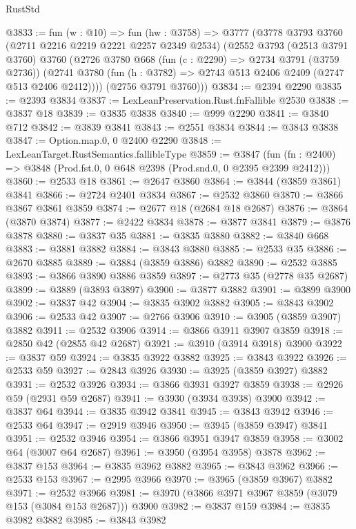 \begin{lexlean}{RustStd}
\begin{coremodule}
@3833 := fun (w : @10) =>
  fun (hw : @3758) =>
  @3777
    (@3778
      @3793
      @3760
      (@2711 @2216 @2219 @2221 @2257 @2349 @2534)
      (@2552
        @3793
        (@2513 @3791 @3760)
        @3760
        (@2726
          @3780
          @668
          (fun (c : @2290) => @2734 @3791 (@3759 @2736))
          (@2741 @3780 (fun (h : @3782) => @2743 @513 @2406 @2409 (@2747 @513 @2406 @2412))))
        (@2756 @3791 @3760)))
@3834 := @2394 @2290
@3835 := @2393 @3834
@3837 := LexLeanPreservation.Rust.fnFallible @2530
@3838 := @3837 @18
@3839 := @3835 @3838
@3840 := @999 @2290
@3841 := @3840 @712
@3842 := @3839 @3841
@3843 := @2551 @3834
@3844 := @3843 @3838
@3847 := Option.map.{0, 0} @2400 @2290
@3848 := LexLeanTarget.RustSemantics.fallibleType
@3859 := @3847
    (fun (fn : @2400) => @3848 (Prod.fst.{0, 0} @648 @2398 (Prod.snd.{0, 0} @2395 @2399 @2412)))
@3860 := @2533 @18
@3861 := @2647 @3860
@3864 := @3844 (@3859 @3861) @3841
@3866 := @2724 @2401 @3834
@3867 := @2532 @3860
@3870 := @3866 @3867 @3861 @3859
@3874 := @2677 @18 (@2684 @18 @2687)
@3876 := @3864 (@3870 @3874)
@3877 := @2422 @3834
@3878 := @3877 @3841
@3879 := @3876 @3878
@3880 := @3837 @35
@3881 := @3835 @3880
@3882 := @3840 @668
@3883 := @3881 @3882
@3884 := @3843 @3880
@3885 := @2533 @35
@3886 := @2670 @3885
@3889 := @3884 (@3859 @3886) @3882
@3890 := @2532 @3885
@3893 := @3866 @3890 @3886 @3859
@3897 := @2773 @35 (@2778 @35 @2687)
@3899 := @3889 (@3893 @3897)
@3900 := @3877 @3882
@3901 := @3899 @3900
@3902 := @3837 @42
@3904 := @3835 @3902 @3882
@3905 := @3843 @3902
@3906 := @2533 @42
@3907 := @2766 @3906
@3910 := @3905 (@3859 @3907) @3882
@3911 := @2532 @3906
@3914 := @3866 @3911 @3907 @3859
@3918 := @2850 @42 (@2855 @42 @2687)
@3921 := @3910 (@3914 @3918) @3900
@3922 := @3837 @59
@3924 := @3835 @3922 @3882
@3925 := @3843 @3922
@3926 := @2533 @59
@3927 := @2843 @3926
@3930 := @3925 (@3859 @3927) @3882
@3931 := @2532 @3926
@3934 := @3866 @3931 @3927 @3859
@3938 := @2926 @59 (@2931 @59 @2687)
@3941 := @3930 (@3934 @3938) @3900
@3942 := @3837 @64
@3944 := @3835 @3942 @3841
@3945 := @3843 @3942
@3946 := @2533 @64
@3947 := @2919 @3946
@3950 := @3945 (@3859 @3947) @3841
@3951 := @2532 @3946
@3954 := @3866 @3951 @3947 @3859
@3958 := @3002 @64 (@3007 @64 @2687)
@3961 := @3950 (@3954 @3958) @3878
@3962 := @3837 @153
@3964 := @3835 @3962 @3882
@3965 := @3843 @3962
@3966 := @2533 @153
@3967 := @2995 @3966
@3970 := @3965 (@3859 @3967) @3882
@3971 := @2532 @3966
@3981 := @3970 (@3866 @3971 @3967 @3859 (@3079 @153 (@3084 @153 @2687))) @3900
@3982 := @3837 @159
@3984 := @3835 @3982 @3882
@3985 := @3843 @3982

\end{coremodule}
\end{lexlean}
